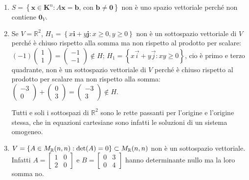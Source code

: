 \documentclass{article}
\begin{document}
\begin{enumerate}
\item $S=\left\{ \mathbf{x\in K}^{n}:A\mathbf{x}=\mathbf{b}\text{, con }%
\mathbf{b\neq 0}\right\} $ non \`{e} uno spazio vettoriale perch\'{e}
non contiene $\mathbf{0}_{V}$.

\item Se $V=%
\mathbb{R}
^{2}$, $H_{1}=\left\{ x\mathbf{i}+y\mathbf{j}:x\geq 0,y\geq 0\right\} $ non 
\`{e} un sottospazio vettoriale di $V$ perch\'{e} \`{e} chiuso rispetto alla
somma ma non rispetto al prodotto per scalare: $\left( -1\right) \left( 
\begin{array}{c}
1 \\ 
1%
\end{array}%
\right) =\left( 
\begin{array}{c}
-1 \\ 
-1%
\end{array}%
\right) \notin H$; $H_{1}=\left\{ x\vec{i}+y\vec{j}:xy\geq 0\right\} $, cio%
\`{e} primo e terzo quadrante, non \`{e} un sottospazio vettoriale di $V$
perch\'{e} \`{e} chiuso rispetto al prodotto per scalare ma non rispetto
alla somma: $\left( 
\begin{array}{c}
-3 \\ 
0%
\end{array}%
\right) +\left( 
\begin{array}{c}
0 \\ 
3%
\end{array}%
\right) =\left( 
\begin{array}{c}
-3 \\ 
3%
\end{array}%
\right) \notin H$.

Tutti e soli i sottospazi di $%
\mathbb{R}
^{2}$ sono le rette passanti per l'origine e l'origine stessa, che in
equazioni cartesiane sono infatti le soluzioni di un sistema omogeneo.

\item $V=\{A\in M_{%
\mathbb{R}
}(n,n):\det (A)=0\}\subset M_{%
\mathbb{R}
}(n,n)$ non \`{e} un sottospazio vettoriale. Infatti $A=\left[ 
\begin{array}{cc}
1 & 0 \\ 
2 & 0%
\end{array}%
\right] $ e $B=\left[ 
\begin{array}{cc}
0 & 3 \\ 
0 & 4%
\end{array}%
\right] $ hanno determinante nullo ma la loro somma no.


\end{enumerate}
\end{document}

